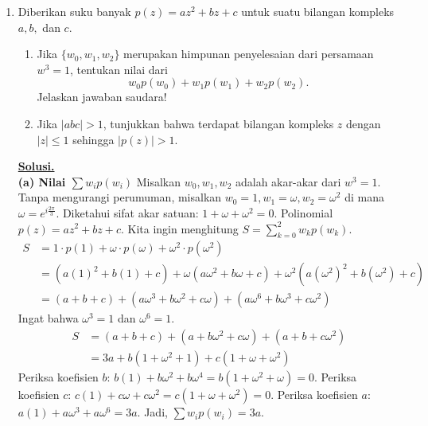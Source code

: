 \documentclass[12pt,twoside]{article}
\newenvironment{solution}
{
	\par\noindent\textbf{\underline{Solusi.}}\\
}
{
	\par
}
\begin{document}
\begin{enumerate}
\begin{solution}
          Karena $a$ adalah selisih dua bilangan bulat, $a$ adalah bilangan bulat.
          Ketaksamaan menjadi:
          \[ |bc - a| < \frac{1}{n} \]
          Bagi kedua ruas dengan $b$ (karena $b > 0$):
          \[ \left| c - \dfrac{a}{b} \right| < \dfrac{1}{bn} \]
          Terbukti.
        \end{solution}
  \item Diberikan suku banyak $p(z)=az^2+bz+c$ untuk suatu bilangan kompleks $a,b,$ dan $c$.
        \begin{enumerate}
          \item Jika $\{w_0,w_1,w_2\}$ merupakan himpunan penyelesaian dari persamaan $w^3=1$, tentukan nilai dari
                $$ w_0p(w_0)+w_1p(w_1)+w_2p(w_2).$$
                Jelaskan jawaban saudara!
          \item Jika $|abc|>1$, tunjukkan bahwa terdapat bilangan kompleks $z$ dengan $|z|\leq 1$ sehingga $|p(z)|>1$.
        \end{enumerate}
        \begin{solution}
          \textbf{(a) Nilai $\sum w_i p(w_i)$}
          Misalkan $w_0, w_1, w_2$ adalah akar-akar dari $w^3=1$. Tanpa mengurangi perumuman, misalkan $w_0=1, w_1=\omega, w_2=\omega^2$ di mana $\omega = e^{i\frac{2\pi}{3}}$.
          Diketahui sifat akar satuan: $1 + \omega + \omega^2 = 0$.
          Polinomial $p(z) = az^2 + bz + c$.
          Kita ingin menghitung $S = \sum_{k=0}^2 w_k p(w_k)$.
          \begin{align*}
            S & = 1\cdot p(1) + \omega \cdot p(\omega) + \omega^2 \cdot p(\omega^2)                                 \\
              & = (a(1)^2 + b(1) + c) + \omega(a\omega^2 + b\omega + c) + \omega^2(a(\omega^2)^2 + b(\omega^2) + c) \\
              & = (a+b+c) + (a\omega^3 + b\omega^2 + c\omega) + (a\omega^6 + b\omega^3 + c\omega^2)
          \end{align*}
          Ingat bahwa $\omega^3 = 1$ dan $\omega^6 = 1$.
          \begin{align*}
            S & = (a+b+c) + (a + b\omega^2 + c\omega) + (a + b + c\omega^2) \\
              & = 3a + b(1 + \omega^2 + 1) + c(1 + \omega + \omega^2)
          \end{align*}
          Periksa koefisien $b$: $b(1) + b\omega^2 + b\omega^4 = b(1 + \omega^2 + \omega) = 0$.
          Periksa koefisien $c$: $c(1) + c\omega + c\omega^2 = c(1+\omega+\omega^2) = 0$.
          Periksa koefisien $a$: $a(1) + a\omega^3 + a\omega^6 = 3a$.
          Jadi, $\sum w_i p(w_i) = 3a$.


\end{solution}
\end{enumerate}
\end{document}
